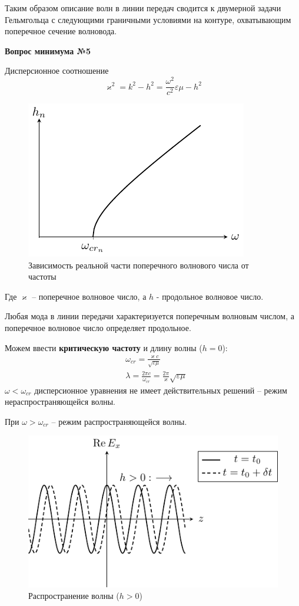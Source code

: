 \documentclass[a4paper,14pt]{extarticle}
\renewcommand{\epsilon}{\varepsilon}
\renewcommand{\kappa}{\varkappa}
\newcommand{\ticket}[1] {
\newpage
\hypertarget{num#1}{}
\begin{center}
	\textbf{Вопрос минимума №#1 }
\end{center}
}
\begin{document}
	Таким образом описание волн в линии передач сводится к двумерной задачи Гельмгольца с следующими граничными условиями на контуре, охватывающим поперечное сечение волновода.
	
\ticket{5}
	Дисперсионное соотношение 
\begin{equation}
	\kappa^2 = k^2 - h^2 = \frac{\omega^2}{c^2}\epsilon\mu - h^2
\end{equation}
	\begin{figure}[h!]
		\centering
		\includegraphics[width = .3\linewidth]{img/lect2_ris6}
		\caption{Зависимость реальной части поперечного волнового числа от частоты}
		\label{fig:wavegain:5}
	\end{figure}
	Где $\kappa$ -- поперечное волновое число, а $h$ - продольное волновое число. 
	
Любая мода в линии передачи характеризуется поперечным волновым числом, а поперечное волновое число определяет продольное.

Можем ввести \textbf{критическую частоту} и длину волны ($h=0$):
\begin{align*}
&\omega_{cr} = \frac{\kappa c}{\sqrt{\epsilon \mu}}\\
&\lambda = \frac{2 \pi c}{\omega_{cr}} = \frac{2 \pi}{\kappa} \sqrt{\epsilon \mu}
\end{align*}
$\omega < \omega_{cr}$ дисперсионное уравнения не имеет действительных решений -- режим нераспространяющейся волны. 

При  $\omega > \omega_{cr}$ -- режим распространяющейся волны.


\begin{figure}[h!]
	\centering
	\includegraphics[scale=1]{img/lect3_ris1}
	\caption{Распространение волны ($h>0$)}
	\label{fig:lect3:1}
\end{figure}
\end{document}
